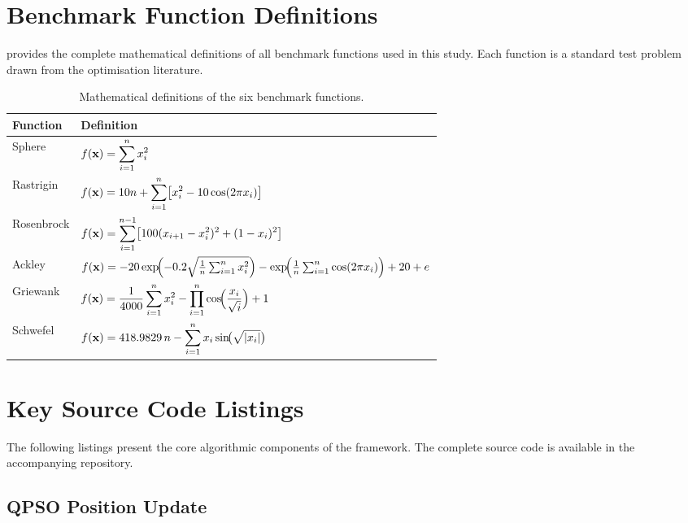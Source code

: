 \section{Benchmark Function Definitions}
\label{app:benchmarks}

 provides the complete mathematical definitions
of all benchmark functions used in this study.  Each function is a standard
test problem drawn from the optimisation literature.

\begin{table}[H]
\centering
\caption{Mathematical definitions of the six benchmark functions.}
\label{tab:benchmark-formulas}
\renewcommand{\arraystretch}{1.6}
\begin{tabularx}{\textwidth}{@{}lX@{}}
\toprule
\textbf{Function} & \textbf{Definition} \\
\midrule
Sphere
  & $f(\mathbf{x}) = \displaystyle\sum_{i=1}^{n} x_i^{2}$ \\
Rastrigin
  & $f(\mathbf{x}) = 10n + \displaystyle\sum_{i=1}^{n}
    \bigl[x_i^{2} - 10\cos(2\pi x_i)\bigr]$ \\
Rosenbrock
  & $f(\mathbf{x}) = \displaystyle\sum_{i=1}^{n-1}
    \bigl[100(x_{i+1} - x_i^{2})^{2} + (1 - x_i)^{2}\bigr]$ \\
Ackley
  & $f(\mathbf{x}) = -20\exp\!\Bigl(-0.2\sqrt{\frac{1}{n}
    \sum_{i=1}^{n} x_i^{2}}\Bigr)
    - \exp\!\Bigl(\frac{1}{n}\sum_{i=1}^{n}\cos(2\pi x_i)\Bigr)
    + 20 + e$ \\
Griewank
  & $f(\mathbf{x}) = \displaystyle\frac{1}{4000}\sum_{i=1}^{n} x_i^{2}
    - \prod_{i=1}^{n}\cos\!\Bigl(\frac{x_i}{\sqrt{i}}\Bigr) + 1$ \\
Schwefel
  & $f(\mathbf{x}) = 418.9829\,n
    - \displaystyle\sum_{i=1}^{n} x_i\sin\!\bigl(\sqrt{|x_i|}\bigr)$ \\
\bottomrule
\end{tabularx}
\end{table}


\section{Key Source Code Listings}
\label{app:code}

The following listings present the core algorithmic components of the
framework.  The complete source code is available in the accompanying
repository.

\subsection{QPSO Position Update}
\label{app:qpso-update}

